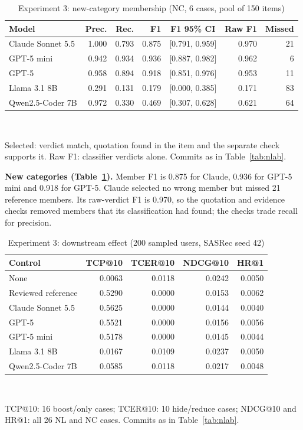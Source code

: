 \documentclass[conference]{IEEEtran}
\begin{document}
\begin{table}[t]\centering\scriptsize
\setlength{\tabcolsep}{2.8pt}
\caption{Experiment 3: new-category membership (NC, 6 cases, pool of 150 items)}\label{tab:nc}
\begin{tabular}{lrrrcrr}\toprule
Model & Prec. & Rec. & F1 & F1 95\% CI & Raw F1 & Missed\\\midrule
Claude Sonnet 5.5 & 1.000 & 0.793 & 0.875 & [0.791, 0.959] & 0.970 & 21\\
GPT-5 mini & 0.942 & 0.934 & 0.936 & [0.887, 0.982] & 0.962 & 6\\
GPT-5 & 0.958 & 0.894 & 0.918 & [0.851, 0.976] & 0.953 & 11\\
Llama 3.1 8B & 0.291 & 0.131 & 0.179 & [0.000, 0.385] & 0.171 & 83\\
Qwen2.5-Coder 7B & 0.972 & 0.330 & 0.469 & [0.307, 0.628] & 0.621 & 64\\
\bottomrule
\end{tabular}\\[2pt]
\parbox{\columnwidth}{\scriptsize Selected: verdict match, quotation found in the item and the separate check supports it. Raw F1: classifier verdicts alone. Commits as in Table~\ref{tab:nlab}.}
\end{table}

\textbf{New categories (Table~\ref{tab:nc}).} Member F1 is 0.875 for Claude, 0.936 for GPT-5 mini and 0.918 for GPT-5. Claude selected no wrong member but missed 21 reference members. Its raw-verdict F1 is 0.970, so the quotation and evidence checks removed members that its classification had found; the checks trade recall for precision.

\begin{table}[t]\centering\footnotesize
\setlength{\tabcolsep}{4pt}
\caption{Experiment 3: downstream effect (200 sampled users, SASRec seed 42)}\label{tab:down}
\begin{tabular}{lrrrr}\toprule
Control & TCP@10 & TCER@10 & NDCG@10 & HR@1\\\midrule
None & 0.0063 & 0.0118 & 0.0242 & 0.0050\\
Reviewed reference & 0.5290 & 0.0000 & 0.0153 & 0.0062\\
Claude Sonnet 5.5 & 0.5625 & 0.0000 & 0.0144 & 0.0040\\
GPT-5 & 0.5521 & 0.0000 & 0.0156 & 0.0056\\
GPT-5 mini & 0.5178 & 0.0000 & 0.0145 & 0.0044\\
Llama 3.1 8B & 0.0167 & 0.0109 & 0.0237 & 0.0050\\
Qwen2.5-Coder 7B & 0.0585 & 0.0118 & 0.0217 & 0.0048\\
\bottomrule
\end{tabular}\\[2pt]
\parbox{\columnwidth}{\scriptsize TCP@10: 16 boost/only cases; TCER@10: 10 hide/reduce cases; NDCG@10 and HR@1: all 26 NL and NC cases. Commits as in Table~\ref{tab:nlab}.}
\end{table}
\end{document}
